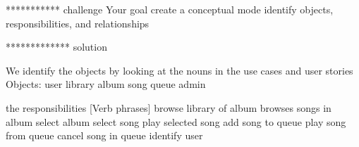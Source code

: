 
***********   challenge 
Your goal
  create a conceptual mode 
    identify objects, responsibilities, and relationships 

************* solution 

We identify the objects by looking at the nouns in the use cases and user stories 
Objects:
  user 
  library 
  album 
  song 
  queue 
  admin 

the responsibilities [Verb phrases]
  browse library of album 
  browses songs in album 
  select album 
  select song 
  play selected song 
  add song to queue 
  play song from queue 
  cancel song in queue 
  identify user 
